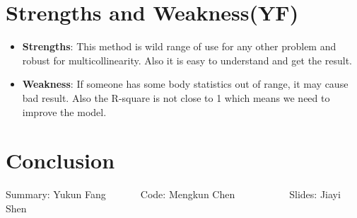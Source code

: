 \documentclass[12pt]{article}
\begin{document}
\section{\sffamily Strengths and Weakness(YF)}
\begin{itemize}
    \item \textbf{Strengths}: This method is wild range of use for any other problem and robust for multicollinearity. Also it is easy to understand and 
    get the result.
    \item \textbf{Weakness}: If someone has some body statistics out of
    range, it may cause bad result. Also the R-square is not close to 1 which means 
    we need to improve the model.
\end{itemize}
\section{\sffamily Conclusion}
    \centerline{Summary: Yukun Fang~~~~~~~Code: Mengkun Chen~~~~~~~~~~~Slides: Jiayi Shen}
\end{document}
